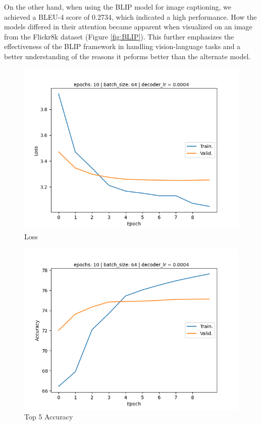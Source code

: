 \documentclass[10pt,twocolumn,letterpaper]{article}
\begin{document}
On the other hand, when using the BLIP model for image captioning, we achieved a BLEU-4 score of 0.2734, which indicated a high performance. How the models differed in their attention became apparent when visualized on an image from the Flickr8k dataset (Figure \ref{fig:BLIP}). This further emphasizes the effectiveness of the BLIP framework in handling vision-language tasks and a better understanding of the reasons it peforms better than the alternate model.

\begin{figure}[!h]
\begin{center}
   \includegraphics[width=0.8\linewidth]{../code/image-captioning-0/plots/learning_curves/loss-81d30535-1546-43f0-9477-e8e6fb14286a.png}
\end{center}
   \caption{Loss}
\label{fig:loss}
\end{figure}

\begin{figure}[!h]
\begin{center}
   \includegraphics[width=0.8\linewidth]{../code/image-captioning-0/plots/learning_curves/accuracy-e934aac6-3f5b-437e-b6ce-b4505513e3d4.png}
\end{center}
   \caption{Top 5 Accuracy}
\label{fig:accuracy}
\end{figure}
\end{document}
